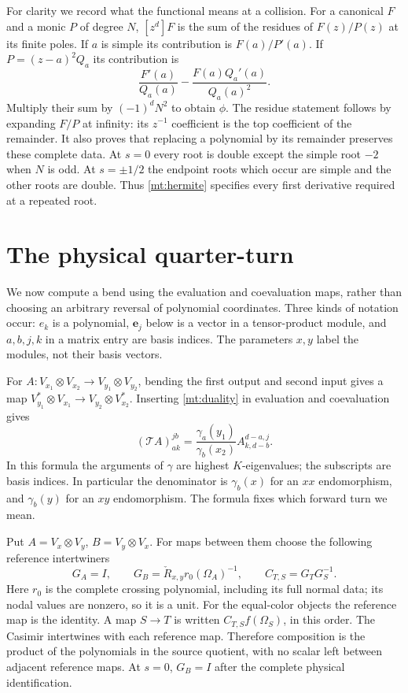\documentclass[11pt]{article}
\numberwithin{equation}{section}
\theoremstyle{definition}\newtheorem{definition}[theorem]{Definition}
\theoremstyle{remark}\newtheorem{remark}[theorem]{Remark}
\newcommand{\Turn}{\mathscr T}
\begin{document}
For clarity we record what the functional means at a collision.
For a canonical $F$ and a monic $P$ of degree $N$,
$[z^d]F$ is the sum of the residues of $F(z)/P(z)$ at its finite
poles. If $a$ is simple its contribution is $F(a)/P'(a)$.
If $P=(z-a)^2Q_a$ its contribution is
\begin{equation}\label{mt:hermite}
 \frac{F'(a)}{Q_a(a)}-
             \frac{F(a)Q_a'(a)}{Q_a(a)^2}.
\end{equation}
Multiply their sum by $(-1)^dN^2$ to obtain $\phi$.
The residue statement follows by expanding $F/P$ at infinity: its
$z^{-1}$ coefficient is the top coefficient of the remainder.
It also proves that replacing a polynomial by its remainder preserves
these complete data. At $s=0$ every root is double except the simple
root $-2$ when $N$ is odd. At $s=\pm1/2$ the endpoint roots which
occur are simple and the other roots are double. Thus
\eqref{mt:hermite} specifies every first derivative required at a repeated root.

\section{The physical quarter-turn}
We now compute a bend using the evaluation and coevaluation maps,
rather than choosing an arbitrary reversal of polynomial coordinates.
Three kinds of notation occur: $e_k$ is a polynomial,
$\mathbf e_j$ below is a vector in a tensor-product module, and
$a,b,j,k$ in a matrix entry are basis indices. The parameters $x,y$
label the modules, not their basis vectors.

For $A:V_{x_1}\otimes V_{x_2}\to V_{y_1}\otimes V_{y_2}$, bending the first output
and second input gives a map $V_{y_1}^*\otimes V_{x_1}\to V_{y_2}\otimes V_{x_2}^*$.
Inserting \eqref{mt:duality} in evaluation and coevaluation gives
\begin{equation}\label{mt:currying}
 (\Turn A)^{jb}_{ak}=
       \frac{\gamma_a(y_1)}{\gamma_b(x_2)}A^{d-a,j}_{k,d-b}.
\end{equation}
In this formula the arguments of $\gamma$ are highest $K$-eigenvalues; the
subscripts are basis indices. In particular the denominator is
$\gamma_b(x)$ for an $xx$ endomorphism, and $\gamma_b(y)$ for an
$xy$ endomorphism. The formula fixes which forward turn we mean.

Put $A=V_x\otimes V_y$, $B=V_y\otimes V_x$. For maps between
them choose the following reference intertwiners
\begin{equation}\label{mt:carriers}
 G_A=I,\qquad G_B=\check R_{x,y}r_0(\Omega_A)^{-1},\qquad
 C_{T,S}=G_TG_S^{-1}.
\end{equation}
Here $r_0$ is the complete crossing polynomial, including its full
normal data; its nodal values are nonzero, so it is a unit.
For the equal-color objects the reference map is the identity. A map
$S\to T$ is written $C_{T,S}f(\Omega_S)$, in this order. The
Casimir intertwines with each reference map. Therefore composition is the
product of the polynomials in the source quotient, with no scalar
left between adjacent reference maps. At $s=0$, $G_B=I$ after the complete
physical identification.
\end{document}
